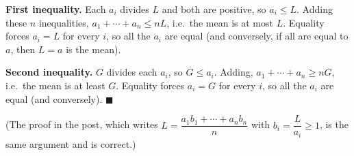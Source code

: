 \textbf{First inequality.} Each $a_i$ divides $L$ and both are positive, so $a_i\le L$. Adding these $n$ inequalities, $a_1+\cdots+a_n\le nL$, i.e.\ the mean is at most $L$. Equality forces $a_i=L$ for every $i$, so all the $a_i$ are equal (and conversely, if all are equal to $a$, then $L=a$ is the mean).

\textbf{Second inequality.} $G$ divides each $a_i$, so $G\le a_i$. Adding, $a_1+\cdots+a_n\ge nG$, i.e.\ the mean is at least $G$. Equality forces $a_i=G$ for every $i$, so all the $a_i$ are equal (and conversely). $\blacksquare$

(The proof in the post, which writes $L=\dfrac{a_1b_1+\cdots+a_nb_n}{n}$ with $b_i=\dfrac{L}{a_i}\ge1$, is the same argument and is correct.)
